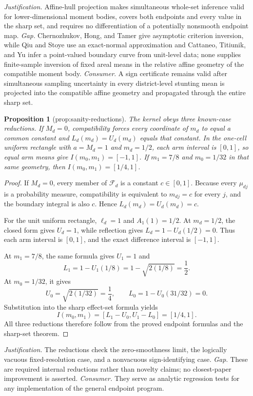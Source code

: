 \documentclass{article}
\newtheorem{proposition}{Proposition}
\begin{document}
\par\smallskip\noindent \textit{Justification.} Affine-hull projection makes simultaneous whole-set inference valid for lower-dimensional moment bodies, covers both endpoints and every value in the sharp set, and requires no differentiation of a potentially nonsmooth endpoint map. \textit{Gap.} Chernozhukov, Hong, and Tamer give asymptotic criterion inversion, while Qiu and Stoye use an exact-normal approximation and Cattaneo, Titiunik, and Yu infer a point-valued boundary curve from unit-level data; none supplies finite-sample inversion of fixed areal means in the relative affine geometry of the compatible moment body. \textit{Consumer.} A sign certificate remains valid after simultaneous sampling uncertainty in every district-level stunting mean is projected into the compatible affine geometry and propagated through the entire sharp set.

\begin{proposition}[prop:sanity-reductions]\label{prop:sanity-reductions}
The kernel obeys three known-case reductions. If \(M_d=0\), compatibility forces every coordinate of \(m_d\) to equal a common constant and \(L_d(m_d)=U_d(m_d)\) equals that constant. In the one-cell uniform rectangle with \(a=M_d=1\) and \(m_d=1/2\), each arm interval is \([0,1]\), so equal arm means give \(I(m_0,m_1)=[-1,1]\). If \(m_1=7/8\) and \(m_0=1/32\) in that same geometry, then \(I(m_0,m_1)=[1/4,1]\).
\end{proposition}
\begin{proof}
If \(M_d=0\), every member of \(\mathcal F_d\) is a constant \(c\in[0,1]\).
Because every \(\mu_{dj}\) is a probability measure, compatibility is equivalent
to \(m_{dj}=c\) for every \(j\), and the boundary integral is also \(c\).  Hence
\(L_d(m_d)=U_d(m_d)=c\).

For the unit uniform rectangle, \(\ell_d=1\) and
\(A_1(1)=1/2\).  At \(m_d=1/2\), the closed form gives \(U_d=1\), while reflection
gives \(L_d=1-U_d(1/2)=0\).  Thus each arm interval is \([0,1]\), and the exact
difference interval is \([-1,1]\).

At \(m_1=7/8\), the same formula gives \(U_1=1\) and
\[
 L_1=1-U_1(1/8)=1-\sqrt{2(1/8)}=\frac12.
\]
At \(m_0=1/32\), it gives
\[
 U_0=\sqrt{2(1/32)}=\frac14,
 \qquad L_0=1-U_0(31/32)=0.
\]
Substitution into the sharp effect-set formula yields
\[
 I(m_0,m_1)=[L_1-U_0,U_1-L_0]=[1/4,1].
\]
All three reductions therefore follow from the proved endpoint formulas and the
sharp-set theorem.
\end{proof}
\par\smallskip\noindent \textit{Justification.} The reductions check the zero-smoothness limit, the logically vacuous fixed-resolution case, and a nonvacuous sign-identifying case. \textit{Gap.} These are required internal reductions rather than novelty claims; no closest-paper improvement is asserted. \textit{Consumer.} They serve as analytic regression tests for any implementation of the general endpoint program.
\end{document}
